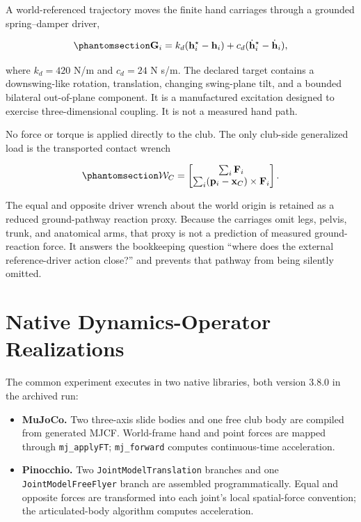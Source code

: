 \documentclass[
  letterpaper,
]{report}
\providecommand{\tightlist}{%
  \setlength{\itemsep}{0pt}\setlength{\parskip}{0pt}}
\begin{document}
A world-referenced trajectory moves the finite hand carriages through a
grounded spring--damper driver,

\begin{equation}\phantomsection\label{eq-spatial-forward-driver}{
\mathbf G_i =
k_d(\mathbf h_i^\star-\mathbf h_i)
+c_d(\dot{\mathbf h}_i^\star-\dot{\mathbf h}_i),
}\end{equation}

where \(k_d=420\) N/m and \(c_d=24\) N s/m. The declared target contains
a downswing-like rotation, translation, changing swing-plane tilt, and a
bounded bilateral out-of-plane component. It is a manufactured
excitation designed to exercise three-dimensional coupling. It is not a
measured hand path.

No force or torque is applied directly to the club. The only club-side
generalized load is the transported contact wrench

\begin{equation}\phantomsection\label{eq-spatial-forward-wrench}{
\mathcal W_C=
\begin{bmatrix}
\sum_i\mathbf F_i\\
\sum_i(\mathbf p_i-\mathbf x_C)\times\mathbf F_i
\end{bmatrix}.
}\end{equation}

The equal and opposite driver wrench about the world origin is retained
as a reduced ground-pathway reaction proxy. Because the carriages omit
legs, pelvis, trunk, and anatomical arms, that proxy is not a prediction
of measured ground-reaction force. It answers the bookkeeping question
``where does the external reference-driver action close?'' and prevents
that pathway from being silently omitted.

\section{Native Dynamics-Operator
Realizations}\label{sec-spatial-forward-engines}

The common experiment executes in two native libraries, both version
3.8.0 in the archived run:

\begin{itemize}
\tightlist
\item
  \textbf{MuJoCo.} Two three-axis slide bodies and one free club body
  are compiled from generated MJCF. World-frame hand and point forces
  are mapped through \texttt{mj\_applyFT}; \texttt{mj\_forward} computes
  continuous-time acceleration.
\item
  \textbf{Pinocchio.} Two \texttt{JointModelTranslation} branches and
  one \texttt{JointModelFreeFlyer} branch are assembled
  programmatically. Equal and opposite forces are transformed into each
  joint's local spatial-force convention; the articulated-body algorithm
  computes acceleration.
\end{itemize}
\end{document}
